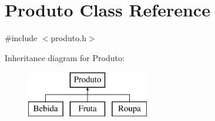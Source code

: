 \hypertarget{classProduto}{}\section{Produto Class Reference}
\label{classProduto}


{\ttfamily \#include $<$produto.\+h$>$}

Inheritance diagram for Produto\+:\begin{figure}[H]
\begin{center}
\leavevmode
\includegraphics[height=2.000000cm]{classProduto}
\end{center}
\end{figure}
